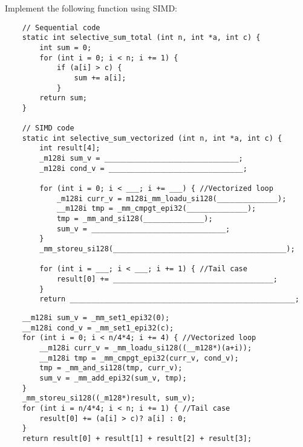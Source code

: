 \begin{blocksection}

\question
Implement the following function using SIMD:

\begin{verbatim}
    // Sequential code
    static int selective_sum_total (int n, int *a, int c) {
        int sum = 0;
        for (int i = 0; i < n; i += 1) {
            if (a[i] > c) {
                sum += a[i];
            }
        return sum;
    }
    
    // SIMD code
    static int selective_sum_vectorized (int n, int *a, int c) {
        int result[4];
        _m128i sum_v = _______________________________;
        _m128i cond_v = _______________________________;
        
        for (int i = 0; i < ___; i += ___) { //Vectorized loop
            _m128i curr_v = m128i_mm_loadu_si128(______________);
            __m128i tmp = _mm_cmpgt_epi32(______________);
            tmp = _mm_and_si128(______________);
            sum_v = _______________________________;
        }
        _mm_storeu_si128(________________________________________);
    
        for (int i = ___; i < ___; i += 1) { //Tail case
            result[0] += _____________________________________;
        }
        return ____________________________________________________;
\end{verbatim}

\begin{solution} [0.5in]
\begin{verbatim}
    __m128i sum_v = _mm_set1_epi32(0);
    __m128i cond_v = _mm_set1_epi32(c);
    for (int i = 0; i < n/4*4; i += 4) { //Vectorized loop
        __m128i curr_v = _mm_loadu_si128((__m128*)(a+i));
        __m128i tmp = _mm_cmpgt_epi32(curr_v, cond_v);
        tmp = _mm_and_si128(tmp, curr_v);
        sum_v = _mm_add_epi32(sum_v, tmp);
    }
    _mm_storeu_si128((_m128*)result, sum_v);
    for (int i = n/4*4; i < n; i += 1) { //Tail case
        result[0] += (a[i] > c)? a[i] : 0;
    }
    return result[0] + result[1] + result[2] + result[3];
\end{verbatim}
\end{solution}
    
\end{blocksection}